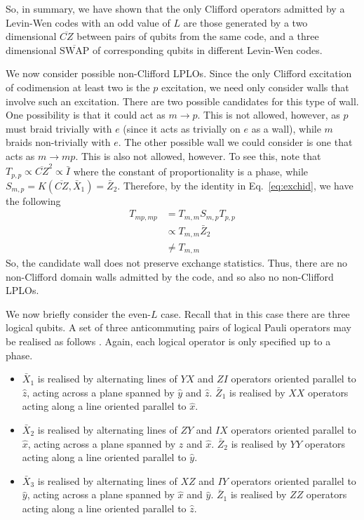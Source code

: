 \documentclass[pra,twocolumn,a4paper,nofootinbib]{revtex4-1}
\begin{document}
So, in summary, we have shown that the only Clifford operators admitted by a Levin-Wen codes with an odd value of $L$ are those generated by a two dimensional $\overline{CZ}$ between pairs of qubits from the same code, and a three dimensional $\overline{\text{SWAP}}$ of corresponding qubits in different Levin-Wen codes.

We now consider possible non-Clifford LPLOs. Since the only Clifford excitation of codimension at least two is the $p$ excitation, we need only consider walls that involve such an excitation. There are two possible candidates for this type of wall. One possibility is that it could act as $m \to p$. This is not allowed, however, as $p$ must braid trivially with $e$ (since it acts as trivially on $e$ as a wall), while $m$ braids non-trivially with $e$.  The other possible wall we could consider is one that acts as $m \to mp$. This is also not allowed, however. To see this, note that $T_{p,p} \propto \overline{CZ}^2 \propto \bar{I}$ where the constant of proportionality is a phase, while $S_{m,p}=K(\overline{CZ},\bar{X}_1)=\bar{Z}_2$. Therefore, by the identity in Eq.~\ref{eq:exchid}, we have the following
\begin{align}
T_{mp,mp} &= T_{m,m}S_{m,p}T_{p,p} \nonumber \\
&\propto T_{m,m} \bar{Z}_2 \nonumber \\
&\neq T_{m,m}
\end{align}
So, the candidate wall does not preserve exchange statistics. Thus, there are no non-Clifford domain walls admitted by the code, and so also no non-Clifford LPLOs.

We now briefly consider the even-$L$ case. Recall that in this case there are three logical qubits. A set of three anticommuting pairs of logical Pauli operators may be realised as follows \cite{Haah}. Again, each logical operator is only specified up to a phase.
\begin{itemize}
\item $\bar{X}_1$ is realised by alternating lines of $YX$ and $ZI$ operators oriented parallel to $\hat{z}$, acting across a plane spanned by $\hat{y}$ and $\hat{z}$. $\bar{Z}_1$ is realised by $XX$ operators acting along a line oriented parallel to $\hat{x}$.
\item $\bar{X}_2$ is realised by alternating lines of $ZY$ and $IX$ operators oriented parallel to $\hat{x}$, acting across a plane spanned by $\hat{z}$ and $\hat{x}$. $\bar{Z}_2$ is realised by $YY$ operators acting along a line oriented parallel to $\hat{y}$.
\item $\bar{X}_3$ is realised by alternating lines of $XZ$ and $IY$ operators oriented parallel to $\hat{y}$, acting across a plane spanned by $\hat{x}$ and $\hat{y}$. $\bar{Z}_1$ is realised by $ZZ$ operators acting along a line oriented parallel to $\hat{z}$.
\end{itemize}
\end{document}
